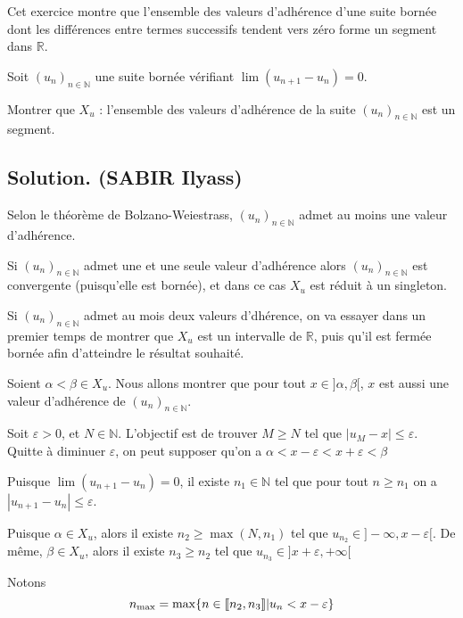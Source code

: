 Cet exercice montre que l'ensemble des valeurs d'adh{\'e}rence d'une suite
born{\'e}e dont les diff{\'e}rences entre termes successifs tendent vers
z{\'e}ro forme un segment dans $\mathbb{R}$.
\begin{exercise}[]
Soit $(u_n)_{n \in \mathbb{N}}$ une suite born{\'e}e v{\'e}rifiant $\lim (u_{n
+ 1} - u_n) = 0$.

Montrer que $X_u$ : l'ensemble des valeurs d'adh{\'e}rence de la suite
$(u_n)_{n \in \mathbb{N}}$ est un segment.
\end{exercise}

\subsection*{Solution. (SABIR Ilyass)}


Selon le th{\'e}or{\`e}me de Bolzano-Weiestrass, $(u_n)_{n \in \mathbb{N}}$
admet au moins une valeur d'adh{\'e}rence.

Si $(u_n)_{n \in \mathbb{N}}$ admet une et une seule valeur d'adh{\'e}rence
alors $(u_n)_{n \in \mathbb{N}}$ est convergente (puisqu'elle est born{\'e}e),
et dans ce cas $X_u$ est r{\'e}duit {\`a} un singleton.

Si $(u_n)_{n \in \mathbb{N}}$ admet au mois deux valeurs d'dh{\'e}rence, on va
essayer dans un premier temps de montrer que $X_u$ est un intervalle de
$\mathbb{R}$, puis qu'il est ferm{\'e}e born{\'e}e afin d'atteindre le
r{\'e}sultat souhait{\'e}.

Soient $\alpha < \beta \in X_u$. Nous allons montrer que pour tout $x \in]
\alpha, \beta [$, $x$ est aussi une valeur d'adh{\'e}rence de $(u_n)_{n \in
\mathbb{N}}$.

Soit $\varepsilon > 0$, et $N \in \mathbb{N}$. L'objectif est de trouver $M
\geqslant N$ tel que $| u_M - x | \leqslant \varepsilon$. Quitte {\`a}
diminuer $\varepsilon$, on peut supposer qu'on a $\alpha < x - \varepsilon < x
+ \varepsilon < \beta$

Puisque $\lim (u_{n + 1} - u_n) = 0$, il existe $n_1 \in \mathbb{N}$ tel que
pour tout $n \geqslant n_1$ on a $| u_{n + 1} - u_n | \leqslant \varepsilon$.

Puisque $\alpha \in X_u$, alors il existe $n_2 \geqslant \max (N, n_1)$ tel
que $u_{n_2} \in] - \infty, x - \varepsilon [$. De m{\^e}me, $\beta \in X_u$,
alors il existe $n_3 \geqslant n_2$ tel que $u_{n_3} \in] x + \varepsilon, +
\infty [$

Notons
\[ n_{\max} = \max \{ n \in \llbracket n_2, n_3 \rrbracket  |  u_n
   < x - \varepsilon \} \]



